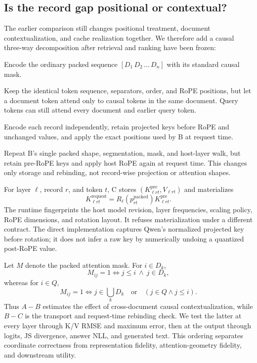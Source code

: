 \documentclass[11pt]{article}
\begin{document}
\subsection{Is the record gap positional or contextual?}
\label{sec:prerope-causal}

The earlier comparison still changes positional treatment, document
contextualization, and cache realization together. We therefore add a causal
three-way decomposition after retrieval and ranking have been frozen:
\begin{description}[leftmargin=2.5em,style=nextline]
    \item[A: FULL\_CAUSAL\_RAG] Encode the ordinary packed sequence
    $[D_1\,D_2\,\ldots\,D_n]$ with its standard causal mask.
    \item[B: NO\_CROSS\_DOC\_RAG] Keep the identical token sequence,
    separators, order, and RoPE positions, but let a document token attend
    only to causal tokens in the same document. Query tokens can still attend
    every document and earlier query token.
    \item[C: PRA\_PRE\_ROPE\_EXACT\_PACKED\_OFFSETS] Encode each record
    independently, retain projected keys before RoPE and unchanged values, and
    apply the exact positions used by B at request time.
    \item[P2: SHAPE\_MATCHED\_PRE\_ROPE\_REBIND] Repeat B's single packed
    shape, segmentation, mask, and host-layer walk, but retain pre-RoPE keys
    and apply host RoPE again at request time. This changes only storage and
    rebinding, not record-wise projection or attention shapes.
\end{description}

For layer $\ell$, record $r$, and token $t$, C stores
$(K^{\mathrm{pre}}_{\ell rt},V_{\ell rt})$ and materializes
\[
K^{\mathrm{request}}_{\ell rt}
=R_\ell(p^{\mathrm{packed}}_{rt})K^{\mathrm{pre}}_{\ell rt}.
\]
The runtime fingerprints the host model revision, layer frequencies, scaling
policy, RoPE dimensions, and rotation layout. It refuses materialization under
a different contract. The direct implementation captures Qwen's normalized
projected key before rotation; it does not infer a raw key by numerically
undoing a quantized post-RoPE value.

Let $M$ denote the packed attention mask. For $i\in D_k$,
\[
M_{ij}=1 \iff j\leq i\ \land\ j\in D_k,
\]
whereas for $i\in Q$,
\[
M_{ij}=1 \iff j\in\bigcup_kD_k
\quad\text{or}\quad(j\in Q\land j\leq i).
\]
Thus $A-B$ estimates the effect of cross-document causal contextualization,
while $B-C$ is the transport and request-time rebinding check. We test the
latter at every layer through K/V RMSE and maximum error, then at the output
through logits, JS divergence, answer NLL, and generated text. This ordering
separates coordinate correctness from representation fidelity,
attention-geometry fidelity, and downstream utility.
\end{document}
